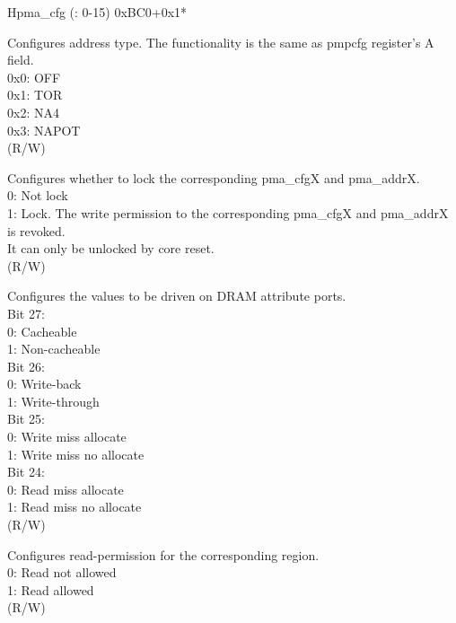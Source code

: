 \begin{register}{H}{pma\_cfg (: 0-15)} {0xBC0+0x1*}
\label{regdesc:pma_cfgX}
%
%
%
%
%
%
%
%
%
%
\regnewline%
\begin{regdesc}
\begin{reglist}
\label{fielddesc:A}\item [A] Configures address type. The functionality is the same as pmpcfg register's A field. \\
0x0: OFF\\
0x1: TOR\\
0x2: NA4\\
0x3: NAPOT\\
(R/W)
\label{fielddesc:LOCK}\item [LOCK] Configures whether to lock the corresponding pma\_cfgX and pma\_addrX. \\
0: Not lock\\
1: Lock. The write permission to the corresponding pma\_cfgX and pma\_addrX is revoked.\\
It can only be unlocked by core reset.\\
(R/W)
\label{fielddesc:ATTRIBUTE}\item [ATTRIBUTE] Configures the values to be driven on DRAM attribute ports. \\
Bit 27: \\
0: Cacheable\\
1: Non-cacheable\\
Bit 26: \\
0: Write-back \\
1: Write-through \\
Bit 25: \\
0: Write miss allocate\\
1: Write miss no allocate \\
Bit 24: \\
0: Read miss allocate\\
1: Read miss no allocate\\
(R/W)
\label{fielddesc:READ}\item [READ] Configures read-permission for the corresponding region.\\
0: Read not allowed\\
1: Read allowed\\
 (R/W)
\item [Continued on the next page...]
\end{reglist}\end{regdesc}
\end{register}
